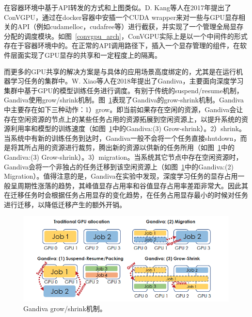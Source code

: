 在容器环境中基于API转发的方式和上图类似。D. Kang等人在2017年提出了ConVGPU\parencite{kang2017convgpu}，通过在docker容器中安插一个CUDA wrapper来对一些与GPU显存相关的API（例如cudamelloc，cudafree等）进行截获，并实现了一个管理全局显存分配的调度模块。如图~\ref{convgpu_arch}，ConVGPU实际上是以一个中间件的形式存在于容器环境中的。在正常的API调用路径下，插入一个显存管理的组件，在软件层面实现了GPU显存的共享和一定程度上的隔离。

而更多的GPU共享的解决方案是与具体的应用场景高度绑定的，尤其是在运行机器学习任务的集群中。W. Xiao等人在2018年提出了Gandiva\parencite{xiao2018gandiva}，主要面向深度学习集群中基于GPU的模型训练任务进行调度。有别于传统的suspend/resume机制，Gandiva使用grow/shrink机制。图~\ref{gandiva_grow_shrink}表现了Gandiva的grow-shrink机制。Gandiva中主要存在如下三种动作：1）grow。即当前如果存在空闲的资源，Gandiva会让存在空闲资源的节点上的某些任务占用的资源拓展到空闲资源上，以提升系统的资源利用率和模型的训练速度（如图~\ref{gandiva_grow_shrink}中的Gandiva:(3) Grow-shrink）。2）shrink。当系统中有新的训练任务到达时，Gandiva一般不会将一个任务直接shutdown，而是将其所占用的资源进行裁剪，腾出新的资源以供新的任务所用（如图~\ref{gandiva_grow_shrink}中的Gandiva:(3) Grow-shrink）。3）migration。当系统其它节点中存在空闲资源时，Gandiva会将一个非独占的任务迁移到该空闲资源上（如图~\ref{gandiva_grow_shrink}中的Gandiva:(2) Migration）。值得注意的是，Gandiva在实验中发现，深度学习任务的显存占用一般呈周期性涨落的趋势，其峰值显存占用率和谷值显存占用率差距非常大。因此其在迁移任务时会根据任务占用显存的变化趋势，在任务占用显存最小的时候对任务进行迁移，以降低迁移产生的额外开销。

\begin{figure}[h]
    \centerline{\includegraphics[width=\textwidth]{figures/gandiva-grow-shrink.png}}
    \caption{Gandiva grow/shrink机制。}
    \label{gandiva_grow_shrink}
\end{figure}

